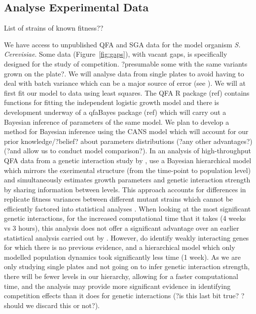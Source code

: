 \subsection{Analyse Experimental Data}
\label{sec:analyse-data}

List of strains of known fitness??

We have access to unpublished QFA and SGA data for the model organism
\textit{S. Cerevisiae}. Some data (Figure~\ref{fig:gaps}), with vacant
gaps, is specifically designed for the study of
competition. ?presumable some with the same variants grown on the
plate?. We will analyse data from single plates to avoid having to
deal with batch variance which can be a major source of error (see
\citet{Baryshnikova2010}). We will at first fit our model to data
using least squares. The QFA R package (ref) contains functions for
fitting the independent logistic growth model and there is development
underway of a qfaBayes package (ref) which will carry out a Bayesian
inference of parameters of the same model. We plan to develop a method
for Bayesian inference using the CANS model which will account for our
prior knowledge/?belief? about parameters distributions (?any other
advantages?) (?and allow us to conduct model comparison?). In an
analysis of high-throughput QFA data from a genetic interaction study
by \citet{Addinall2011}, \citet{Heydari2016} use a Bayesian
hierarchical model which mirrors the exerimental structure (from the
time-point to population level) and simultaneously estimates growth
parameters and genetic interaction strength by sharing information
between levels. This approach accounts for differences in replicate
fitness variances between different mutant strains which cannot be
efficiently factored into statistical analyses
\citep{Heydari2016}. When looking at the most significant genetic
interactions, for the increased computational time that it takes (4
weeks vs 3 hours), this analysis does not offer a significant
advantage over an earlier statistical analysis carried out by
\citet{Addinall2011}. However, \citet{Heydari2016} do identify weakly
interacting genes for which there is no previous evidence, and a
hierarchical model which only modelled population dynamics took
significantly less time (1 week). As we are only studying single
plates and not going on to infer genetic interaction strength, there
will be fewer levels in our hierarchy, allowing for a faster
computational time, and the analysis may provide more significant
evidence in identifying competition effects than it does for genetic
interactions (?is this last bit true? ?should we discard this or
not?).

